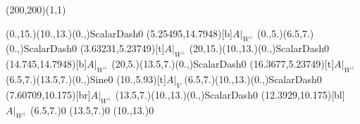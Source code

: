 \unitlength=1bp%

\begin{feynartspicture}(200,200)(1,1)

\FADiagram{}
\FAProp(0.,15.)(10.,13.)(0.,){ScalarDash}{0}
\FALabel(5.25495,14.7948)[b]{$A|_{W^\perp}$}
\FAProp(0.,5.)(6.5,7.)(0.,){ScalarDash}{0}
\FALabel(3.63231,5.23749)[t]{$A|_{W^\perp}$}
\FAProp(20,15.)(10.,13.)(0.,){ScalarDash}{0}
\FALabel(14.745,14.7948)[b]{$A|_{W^\perp}$}
\FAProp(20,5.)(13.5,7.)(0.,){ScalarDash}{0}
\FALabel(16.3677,5.23749)[t]{$A|_{W^\perp}$}
\FAProp(6.5,7.)(13.5,7.)(0.,){Sine}{0}
\FALabel(10.,5.93)[t]{$A|_V$}
\FAProp(6.5,7.)(10.,13.)(0.,){ScalarDash}{0}
\FALabel(7.60709,10.175)[br]{$A|_{W^\perp}$}
\FAProp(13.5,7.)(10.,13.)(0.,){ScalarDash}{0}
\FALabel(12.3929,10.175)[bl]{$A|_{W^\perp}$}
\FAVert(6.5,7.){0}
\FAVert(13.5,7.){0}
\FAVert(10.,13.){0}
\end{feynartspicture}

